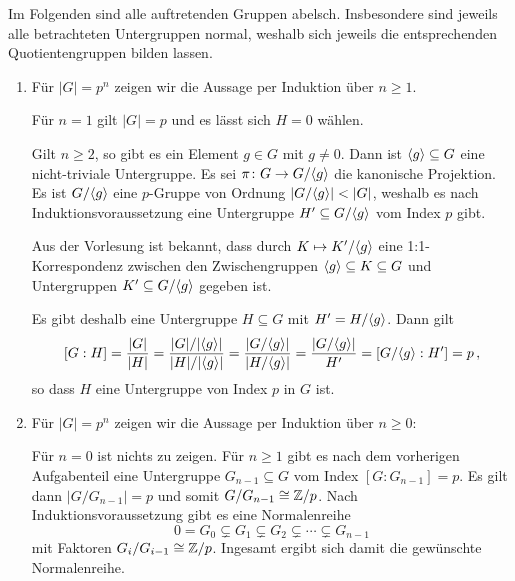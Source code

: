 \begin{solution}
  Im Folgenden sind alle auftretenden Gruppen abelsch.
  Insbesondere sind jeweils alle betrachteten Untergruppen normal, weshalb sich jeweils die entsprechenden Quotientengruppen bilden lassen.
  \begin{enumerate}
    \item
      Für $|G| = p^n$ zeigen wir die Aussage per Induktion über $n \geq 1$.
      
      Für $n = 1$ gilt $|G| = p$ und es lässt sich $H = 0$ wählen.
      
      Gilt $n \geq 2$, so gibt es ein Element $g \in G$ mit $g \neq 0$.
      Dann ist $\langle g\rangle \subseteq G$ eine nicht-triviale Untergruppe.
      Es sei $\pi \colon G \to G/\langle g\rangle$ die kanonische Projektion.
      Es ist $G/\langle g\rangle$ eine $p$-Gruppe von Ordnung $|G/\langle g\rangle| < |G|$, weshalb es nach Induktionsvoraussetzung eine Untergruppe $H' \subseteq G/\langle g\rangle$ vom Index $p$ gibt.
      
      Aus der Vorlesung ist bekannt, dass durch $K \mapsto K'/\langle g\rangle$ eine 1:1-Korrespondenz zwischen den Zwischengruppen $\langle g\rangle \subseteq K \subseteq G$ und Untergruppen $K' \subseteq G/\langle g\rangle$ gegeben ist.
      
      Es gibt deshalb eine Untergruppe $H \subseteq G$ mit $H' = H/\langle g\rangle$.
      Dann gilt
      \[
          [G : H]
        = \frac{|G|}{|H|}
        = \frac{|G|/|\langle g\rangle|}{|H|/|\langle g\rangle|}
        = \frac{|G/\langle g\rangle|}{|H/\langle g\rangle|}
        = \frac{|G/\langle g\rangle|}{H'}
        = [G/\langle g\rangle : H']
        = p \,,
      \]
      so dass $H$ eine Untergruppe von Index $p$ in $G$ ist.
    \item
      Für $|G| = p^n$ zeigen wir die Aussage per Induktion über $n \geq 0$:
      
      Für $n = 0$ ist nichts zu zeigen.
      Für $n \geq 1$ gibt es nach dem vorherigen Aufgabenteil eine Untergruppe $G_{n-1} \subseteq G$ vom Index $[G : G_{n-1}] = p$.
      Es gilt dann $|G/G_{n-1}| = p$ und somit $G/G_{n-1} \cong \mathbb{Z}/p$.
      Nach Induktionsvoraussetzung gibt es eine Normalenreihe
      \[
                    0
        =           G_0
        \subsetneq  G_1
        \subsetneq  G_2
        \subsetneq  \dotsb
        \subsetneq  G_{n-1}
      \]
      mit Faktoren $G_i/G_{i-1} \cong \mathbb{Z}/p$.
      Ingesamt ergibt sich damit die gewünschte Normalenreihe.
  \end{enumerate}
\end{solution}


